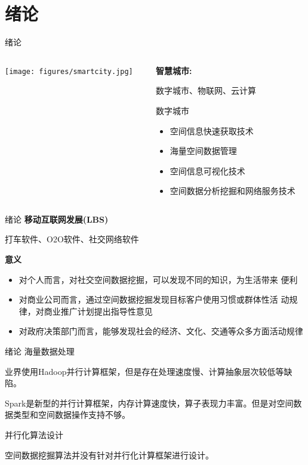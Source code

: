 \section{绪论}

\begin{frame}{绪论}
    \begin{columns}
        \begin{column}{0.5\textwidth}
        \texttt{[image: figures/smartcity.jpg]}
        \end{column}

        \begin{column}{0.5\textwidth}
        \textbf{智慧城市:} 
        
        数字城市、物联网、云计算
        \vspace{2em}

        \pause
        \alert{数字城市}
        \begin{itemize}
        \pause
        \item 空间信息快速获取技术
        \pause
        \item 海量空间数据管理
        \pause
        \item 空间信息可视化技术
        \pause
        \item 空间数据分析挖掘和网络服务技术
        \end{itemize}
        \end{column}
   \end{columns}
\end{frame}

\begin{frame}{绪论}
    \textbf{移动互联网发展(LBS)}

    打车软件、O2O软件、社交网络软件

    \vspace{2em}
    \pause
    \textbf{意义}
    \begin{itemize}
        \pause
        \item 对个人而言，对社交空间数据挖掘，可以发现不同的知识，为生活带来 便利
        \pause
        \item 对商业公司而言，通过空间数据挖掘发现目标客户使用习惯或群体性活 动规律，对商业推广计划提出指导性意见
        \pause
        \item 对政府决策部门而言，能够发现社会的经济、文化、交通等众多方面活动规律
    \end{itemize}
\end{frame}

\begin{frame}[c]{绪论}
\alert{海量数据处理}

业界使用Hadoop并行计算框架，但是存在处理速度慢、计算抽象层次较低等缺陷。

\pause
Spark是新型的并行计算框架，内存计算速度快，算子表现力丰富。但是对空间数据类型和空间数据操作支持不够。

\vspace{2em}

\pause
\alert{并行化算法设计}

空间数据挖掘算法并没有针对并行化计算框架进行设计。

\end{frame}

